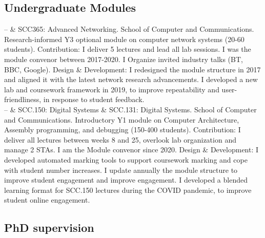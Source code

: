 \documentclass[10pt, a4paper]{article}
\newcommand{\LUSCC}{School of Computer and Communications}
\newcommand{\Duration}[2]{\fontsize{10pt}{0}\selectfont #1--#2}
\newcommand{\Ongoing}{}
\begin{document}
\subsection{Undergraduate Modules}

\begin{EntriesTable}
   \Duration{2017}{\Ongoing}  &
   SCC365: Advanced Networking. \LUSCC. \newline
Research-informed Y3 optional module on computer network systems (20-60
students). \newline
Contribution: I deliver 5 lectures and lead all lab sessions. I was the module
convenor between 2017-2020. I Organize invited industry talks (BT, BBC, Google).\newline
Design \& Development: I redesigned the module structure in 2017 and aligned it
with the latest network research advancements. I developed a new 
lab and coursework framework in 2019, to improve repeatability and
user-friendliness, in response to student feedback.
    \\
    \Duration{2016}{\Ongoing} &
    SCC.150: Digital Systems \& SCC.131: Digital Systems. \LUSCC.
    \newline
Introductory Y1 module on Computer Architecture, Assembly programming, and
debugging (150-400 students).
    \newline
Contribution: I deliver all lectures between weeks 8 and 25, overlook lab organization and
manage 2 STAs. I am the
Module convenor since 2020.\newline
Design \& Development: I developed automated marking tools to
support coursework marking and cope with student number increases. 
I update annually the module structure to improve student engagement and improve
engagement. I developed a blended learning format for SCC.150 lectures during
the COVID pandemic, to improve student online engagement.   
\end{EntriesTable}


\subsection{P\lowercase{h}D supervision}
\end{document}
